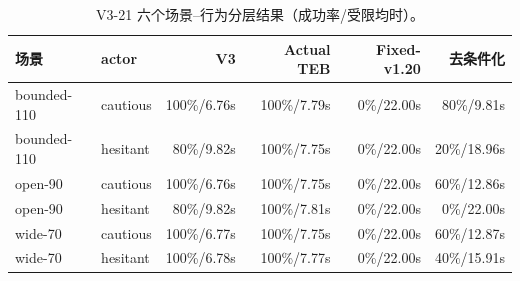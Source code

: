 \begin{table}[htbp]
\centering
\caption{V3-21 六个场景--行为分层结果（成功率/受限均时）。}
\label{tab:v321-strata}
\scriptsize
\begin{tabular}{llrrrr}
\toprule
场景 & actor & V3 & Actual TEB & Fixed-v1.20 & 去条件化\\
\midrule
bounded-110 & cautious & 100\%/6.76s & 100\%/7.79s & 0\%/22.00s & 80\%/9.81s\\
bounded-110 & hesitant & 80\%/9.82s & 100\%/7.75s & 0\%/22.00s & 20\%/18.96s\\
open-90 & cautious & 100\%/6.76s & 100\%/7.75s & 0\%/22.00s & 60\%/12.86s\\
open-90 & hesitant & 80\%/9.82s & 100\%/7.81s & 0\%/22.00s & 0\%/22.00s\\
wide-70 & cautious & 100\%/6.77s & 100\%/7.75s & 0\%/22.00s & 60\%/12.87s\\
wide-70 & hesitant & 100\%/6.78s & 100\%/7.77s & 0\%/22.00s & 40\%/15.91s\\
\bottomrule
\end{tabular}
\end{table}
